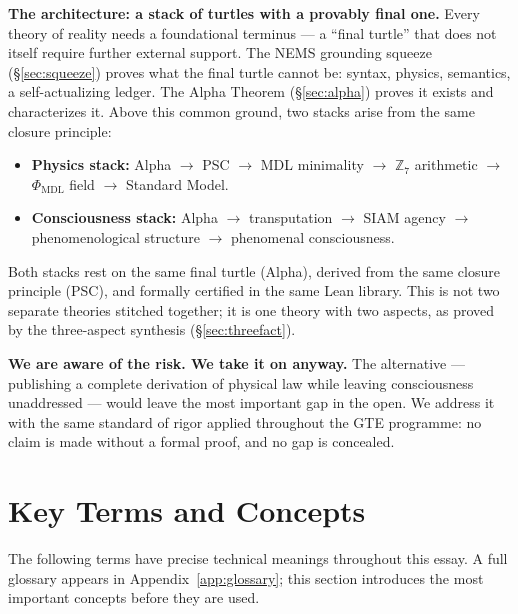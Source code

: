 \documentclass[11pt]{article}
\theoremstyle{remark}
\newcommand{\PHIMDL}{\Phi_{\mathrm{MDL}}}
\newcommand{\ZS}{\mathbb{Z}_7}
\begin{document}
\begin{tcolorbox}[colback=orange!4,colframe=orange!60!black,breakable,
  title={Why a physics paper must address consciousness}]
\medskip
\textbf{The architecture: a stack of turtles with a provably final one.}
Every theory of reality needs a foundational terminus --- a ``final turtle'' that does
not itself require further external support. The NEMS grounding squeeze (\S\ref{sec:squeeze})
proves what the final turtle cannot be: syntax, physics, semantics, a self-actualizing
ledger. The Alpha Theorem (\S\ref{sec:alpha}) proves it exists and characterizes it.
Above this common ground, two stacks arise from the same closure principle:
\begin{itemize}[itemsep=1pt,topsep=2pt]
  \item \textbf{Physics stack:} Alpha $\to$ PSC $\to$ MDL minimality $\to$ $\ZS$
    arithmetic $\to$ $\PHIMDL$ field $\to$ Standard Model.
  \item \textbf{Consciousness stack:} Alpha $\to$ transputation $\to$ SIAM agency
    $\to$ phenomenological structure $\to$ phenomenal consciousness.
\end{itemize}
Both stacks rest on the same final turtle (Alpha), derived from the same closure
principle (PSC), and formally certified in the same Lean library. This is not two
separate theories stitched together; it is one theory with two aspects, as proved
by the three-aspect synthesis (\S\ref{sec:threefact}).

\medskip
\textbf{We are aware of the risk. We take it on anyway.}
The alternative --- publishing a complete derivation of physical law while leaving
consciousness unaddressed --- would leave the most important gap in the open. We
address it with the same standard of rigor applied throughout the GTE programme:
no claim is made without a formal proof, and no gap is concealed.
\end{tcolorbox}

\section{Key Terms and Concepts}\label{sec:glossary-intro}

The following terms have precise technical meanings throughout this essay.
A full glossary appears in Appendix~\ref{app:glossary}; this section introduces
the most important concepts before they are used.
\end{document}
